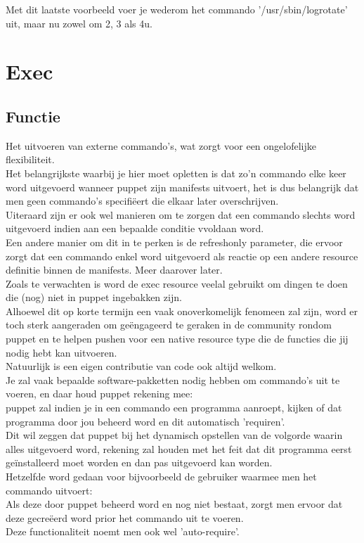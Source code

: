	Met dit laatste voorbeeld voer je wederom het commando '/usr/sbin/logrotate' uit, maar nu zowel om 2, 3 als 4u.\\

\section{Exec}
\subsection{Functie}
	Het uitvoeren van externe commando's, wat zorgt voor een ongelofelijke flexibiliteit.\\
	Het belangrijkste waarbij je hier moet opletten is dat zo'n commando elke keer word uitgevoerd wanneer puppet zijn manifests uitvoert, het is dus belangrijk dat men geen commando's specifi\"{e}ert die elkaar later overschrijven.\\
	Uiteraard zijn er ook wel manieren om te zorgen dat een commando slechts word uitgevoerd indien aan een bepaalde conditie vvoldaan word.\\
	Een andere manier om dit in te perken is de refreshonly parameter, die ervoor zorgt dat een commando enkel word uitgevoerd als reactie op een andere resource definitie binnen de manifests. Meer daarover later.\\

	Zoals te verwachten is word de exec resource veelal gebruikt om dingen te doen die (nog) niet in puppet ingebakken zijn.\\
	Alhoewel dit op korte termijn een vaak onoverkomelijk fenomeen zal zijn, word er toch sterk aangeraden om ge\"{e}ngageerd te geraken in de community rondom puppet en te helpen pushen voor een native resource type die de functies die jij nodig hebt kan uitvoeren.\\
	Natuurlijk is een eigen contributie van code ook altijd welkom.\\

	Je zal vaak bepaalde software-pakketten nodig hebben om commando's uit te voeren, en daar houd puppet rekening mee:\\
	puppet zal indien je in een commando een programma aanroept, kijken of dat programma door jou beheerd word en dit automatisch 'requiren'.\\
	Dit wil zeggen dat puppet bij het dynamisch opstellen van de volgorde waarin alles uitgevoerd word, rekening zal houden met het feit dat dit programma eerst geïnstalleerd moet worden en dan pas uitgevoerd kan worden.\\
	Hetzelfde word gedaan voor bijvoorbeeld de gebruiker waarmee men het commando uitvoert:\\
	Als deze door puppet beheerd word en nog niet bestaat, zorgt men ervoor dat deze gecre\"{e}erd word prior het commando uit te voeren.\\
	Deze functionaliteit noemt men ook wel 'auto-require'.\\

